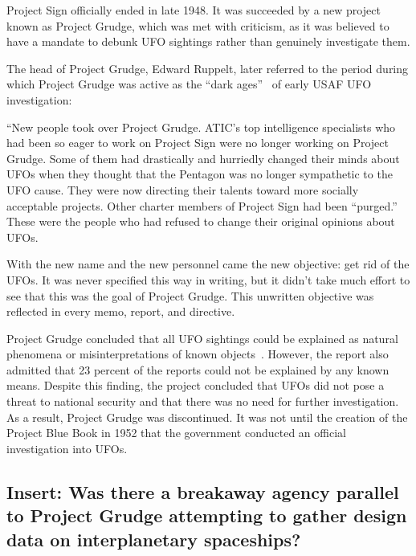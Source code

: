 Project Sign officially ended in late 1948. It was succeeded by a new project known as Project Grudge, which was met with criticism, as it was believed to have a mandate to debunk UFO sightings rather than genuinely investigate them.

The head of Project Grudge, Edward Ruppelt, later referred to the period during which Project Grudge was active as the ``dark ages''~\cite[Chapter~5]{Ruppelt2011May} of early USAF UFO investigation:
\begin{svgraybox}
``New people took over Project Grudge. ATIC's top intelligence specialists who had been so eager to work on Project Sign
were no longer working on Project Grudge. Some of them had drastically and hurriedly changed their minds about
      UFOs  when they thought that the Pentagon was no longer sympathetic to the UFO cause.
They were now directing their talents toward more socially acceptable projects.
 Other charter members of Project Sign had been ``purged.'' These were the people who had refused to change their original opinions about UFOs.


      With the new name and the new personnel came the new objective: get rid of the UFOs.
It was never specified this way in writing, but it didn't take much effort to see that this was the goal of Project Grudge.
This unwritten objective was reflected in every memo, report, and directive.
\end{svgraybox}


Project Grudge concluded that all UFO sightings could be explained as natural phenomena or misinterpretations of known objects~\cite[Chapter~4]{Jacobsen2011}. However, the report also admitted that 23 percent of the reports could not be explained by any known means. Despite this finding, the project concluded that UFOs did not pose a threat to national security and that there was no need for further investigation. As a result, Project Grudge was discontinued. It was not until the creation of the Project Blue Book in 1952 that the government conducted an official investigation into UFOs.

\subsection{Insert: Was there a breakaway agency parallel to Project Grudge attempting to gather design data on interplanetary spaceships?}
\label{2023-UFO-part-Perception-types-USA-baa}

